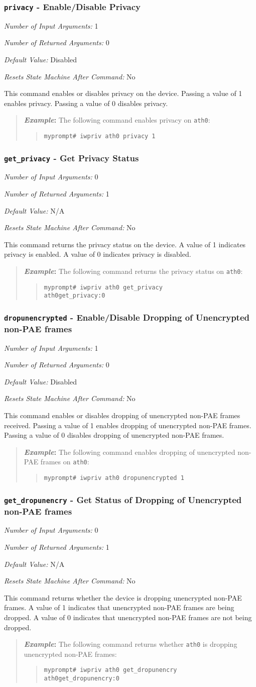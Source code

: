 \documentclass[10pt,fullpage]{article}
\newcommand{\mytt}[1]{{\texttt{#1}}}
\newcommand{\bv}{\begin{verse}}
\newcommand{\ev}{\end{verse}}
\newcommand{\cmd}[1]{{\texttt{myprompt\# #1}}}
\newcommand{\argdesc}[4]{\begin{description}
\itemsep -6pt
\item \textit{Number of Input Arguments:} #1
\item \textit{Number of Returned Arguments:} #2
\item \textit{Default Value:} #3
\item \textit{Resets State Machine After Command:} #4
\end{description}
}
\newenvironment{example}{\begin{quote}\textbf{\textit{Example}:}}{\end{quote}}
\begin{document}
\subsubsection{\mytt{privacy} - Enable/Disable Privacy}
\argdesc{1}{0}{Disabled}{No}
This command enables or disables privacy on the device.  Passing a
value of 1 enables privacy. Passing a value of 0 disables privacy.
\begin{example}
  The following command enables privacy on \mytt{ath0}:
  \bv
  \cmd{iwpriv ath0 privacy 1}
  \ev
\end{example}

\subsubsection{\mytt{get\_privacy} - Get Privacy Status}
\argdesc{0}{1}{N/A}{No}
This command returns the privacy status on the device.  A value of 1
indicates privacy is enabled. A value of 0 indicates privacy is
disabled.
\begin{example}
  The following command returns the privacy status on \mytt{ath0}:
  \bv
  \cmd{iwpriv ath0 get\_privacy}\\
  \mytt{ath0\hspace{32pt}get\_privacy:0}
  \ev
\end{example}

\subsubsection{\mytt{dropunencrypted} - Enable/Disable Dropping of
  Unencrypted non-PAE frames}
\argdesc{1}{0}{Disabled}{No}
This command enables or disables dropping of unencrypted non-PAE
frames received.  Passing a value of 1 enables dropping of unencrypted
non-PAE frames.  Passing a value of 0 disables dropping of unencrypted
non-PAE frames.
\begin{example}
  The following command enables dropping of unencrypted non-PAE frames
  on \mytt{ath0}:
  \bv
  \cmd{iwpriv ath0 dropunencrypted 1}
  \ev
\end{example}

\subsubsection{\mytt{get\_dropunencry} - Get Status of Dropping of
  Unencrypted non-PAE frames}
\argdesc{0}{1}{N/A}{No}
This command returns whether the device is dropping unencrypted
non-PAE frames.  A value of 1 indicates that unencrypted non-PAE
frames are being dropped.  A value of 0 indicates that unencrypted
non-PAE frames are not being dropped.
\begin{example}
  The following command returns whether \mytt{ath0} is dropping
  unencrypted non-PAE frames:
  \bv
  \cmd{iwpriv ath0 get\_dropunencry}\\
  \mytt{ath0\hspace{32pt}get\_dropunencry:0}
  \ev
\end{example}
\end{document}

